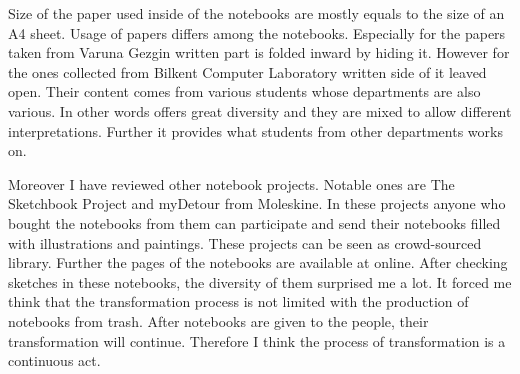 



Size of the paper used inside of the notebooks are mostly equals to the size of an A4 sheet. Usage of papers differs among the notebooks. Especially for the papers taken from Varuna Gezgin written part is folded inward by hiding it. However for the ones collected from Bilkent Computer Laboratory written side of it leaved open. Their content comes from various students whose departments are also various. In other words offers great diversity and they are mixed to allow different interpretations. Further it provides what students from other departments works on. %






Moreover I have reviewed other notebook projects. Notable ones are The Sketchbook Project and myDetour from Moleskine. In these projects anyone who bought the notebooks from them can participate and send their notebooks filled with illustrations and paintings. These projects can be seen as crowd-sourced library. Further the pages of the notebooks are available at online. After checking sketches in these notebooks, the diversity of them surprised me a lot. It forced me think that the transformation process is not limited with the production of notebooks from trash. After notebooks are given to the people, their transformation will continue. Therefore I think the process of transformation is a continuous act.

